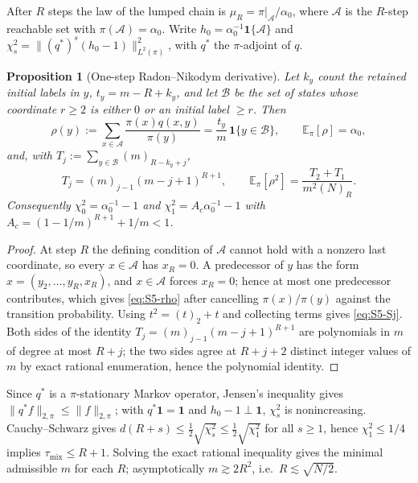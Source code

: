 \documentclass[twoside,11pt]{article}
\newtheorem{sprop}[slemma]{Proposition}
\begin{document}
After $R$ steps the law of the lumped chain is $\mu_R=\pi|_{\mathcal{A}}/\alpha_0$,
where $\mathcal{A}$ is the $R$-step reachable set with $\pi(\mathcal{A})=\alpha_0$. Write
$h_0=\alpha_0^{-1}\mathbf{1}\{\mathcal{A}\}$ and
$\chi^2_s=\|(q^{*})^{s}(h_0-1)\|_{L^2(\pi)}^{2}$, with $q^*$ the
$\pi$-adjoint of $q$.

\begin{sprop}[One-step Radon--Nikodym derivative]\label{prop:rho}
Let $k_y$ count the retained initial labels in $y$, $t_y=m-R+k_y$, and let
$\mathcal{B}$ be the set of states whose coordinate $r\ge2$ is either $0$ or an
initial label $\ge r$. Then
\begin{equation}\label{eq:S5-rho}
\rho(y):=\sum_{x\in\mathcal{A}}\frac{\pi(x)q(x,y)}{\pi(y)}
=\frac{t_y}{m}\,\mathbf{1}\{y\in\mathcal{B}\},\qquad \mathbb E_{\pi}[\rho]=\alpha_0,
\end{equation}
and, with $T_j:=\sum_{y\in\mathcal{B}}(m)_{R-k_y+j}$,
\begin{equation}\label{eq:S5-Sj}
T_j=(m)_{j-1}(m-j+1)^{R+1},\qquad
\mathbb E_{\pi}[\rho^{2}]=\frac{T_2+T_1}{m^{2}(N)_R}.
\end{equation}
Consequently
$\chi^2_0=\alpha_0^{-1}-1$ and
$\chi^2_1=A_c\alpha_0^{-1}-1$ with
$A_c=(1-1/m)^{R+1}+1/m<1$.
\end{sprop}

\begin{proof}
At step $R$ the defining condition of $\mathcal{A}$ cannot hold with a nonzero last
coordinate, so every $x\in\mathcal{A}$ has $x_R=0$. A predecessor of $y$ has the form
$x=(y_2,\dots,y_R,x_R)$, and $x\in\mathcal{A}$ forces $x_R=0$; hence at most one
predecessor contributes, which gives \eqref{eq:S5-rho} after cancelling
$\pi(x)/\pi(y)$ against the transition probability. Using
$t^{2}=(t)_2+t$ and collecting terms gives \eqref{eq:S5-Sj}. Both sides of
the identity $T_j=(m)_{j-1}(m-j+1)^{R+1}$ are polynomials in $m$ of degree
at most $R+j$; the two sides agree at $R+j+2$ distinct integer
values of $m$ by exact rational enumeration, hence the polynomial identity.
\end{proof}

Since $q^*$ is a $\pi$-stationary Markov operator, Jensen's inequality gives
$\|q^*f\|_{2,\pi}\le\|f\|_{2,\pi}$; with $q^*\mathbf 1=\mathbf 1$ and
$h_0-1\perp\mathbf 1$, $\chi^2_s$ is nonincreasing. Cauchy--Schwarz gives
$d(R+s)\le\tfrac12\sqrt{\chi^2_s}\le\tfrac12\sqrt{\chi^2_1}$ for all
$s\ge1$, hence $\chi^2_1\le1/4$ implies $\tau_{\mathrm{mix}}\le R+1$. Solving the exact
rational inequality gives the minimal admissible $m$ for each $R$;
asymptotically $m\gtrsim2R^{2}$, i.e.\ $R\lesssim\sqrt{N/2}$.
\end{document}
